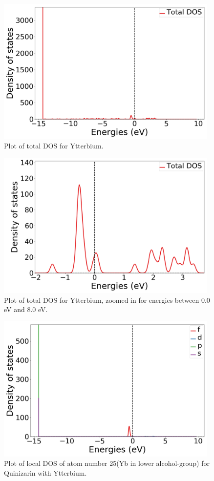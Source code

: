 \documentclass{article}
\begin{document}
  \begin{figure}[H]
      \centering
      \includegraphics[width = 11cm]{../fig/Yb_TDOS_1.png}
      \caption{Plot of total DOS for Ytterbium. }
      \label{fig:Yb_TDOS_1.png}
  \end{figure}

  \begin{figure}[H]
      \centering
      \includegraphics[width = 11cm]{../fig/Yb_TDOS_2.png}
      \caption{Plot of total DOS for Ytterbium, zoomed in for energies between 0.0 eV and 8.0 eV. }
      \label{fig:Yb_TDOS_2.png}
  \end{figure}

  \begin{figure}[H]
      \centering
      \includegraphics[width = 11cm]{../fig/Yb_LDOS25_1.png}
      \caption{Plot of local DOS of atom number 25(Yb in lower alcohol-group) for Quinizarin with Ytterbium. }
      \label{fig:Yb_LDOS25_1.png}
  \end{figure}
\end{document}
